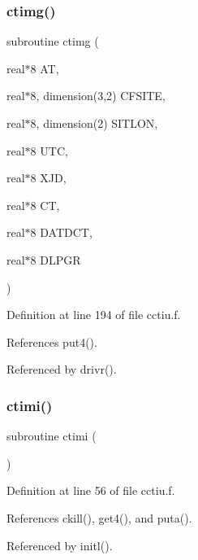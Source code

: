\subsubsection{\texorpdfstring{ctimg()}{ctimg()}}
{\footnotesize\ttfamily subroutine ctimg (\begin{DoxyParamCaption}\item[{real$\ast$8}]{AT,  }\item[{real$\ast$8, dimension(3,2)}]{C\+F\+S\+I\+TE,  }\item[{real$\ast$8, dimension(2)}]{S\+I\+T\+L\+ON,  }\item[{real$\ast$8}]{U\+TC,  }\item[{real$\ast$8}]{X\+JD,  }\item[{real$\ast$8}]{CT,  }\item[{real$\ast$8}]{D\+A\+T\+D\+CT,  }\item[{real$\ast$8}]{D\+L\+P\+GR }\end{DoxyParamCaption})}



Definition at line 194 of file cctiu.\+f.



References put4().



Referenced by drivr().

\mbox{\label{cctiu_8f_aad18542389a42ccfe6498ba89b8da10a}} 
\subsubsection{\texorpdfstring{ctimi()}{ctimi()}}
{\footnotesize\ttfamily subroutine ctimi (\begin{DoxyParamCaption}{ }\end{DoxyParamCaption})}



Definition at line 56 of file cctiu.\+f.



References ckill(), get4(), and puta().



Referenced by initl().

